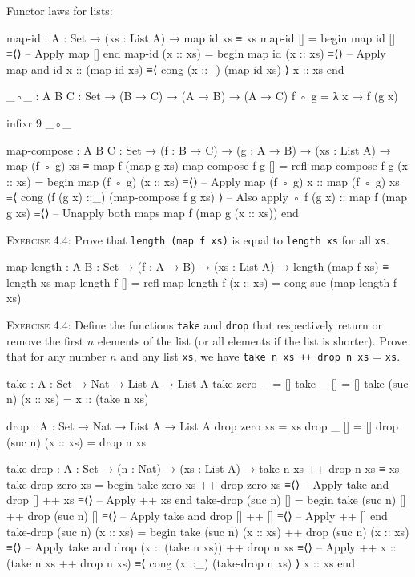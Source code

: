 \documentclass{article}
\begin{document}
\noindent
Functor laws for lists:

\begin{code}
map-id : { A : Set } → (xs : List A) → map id xs ≡ xs
map-id [] =
  begin
    map id []
  ≡⟨⟩ -- Apply map
    []
  end
map-id (x :: xs) =
  begin
    map id (x :: xs)
  ≡⟨⟩ -- Apply map and id
    x :: (map id xs)
  ≡⟨ cong (x ::_) (map-id xs) ⟩
    x :: xs
  end
\end{code}

\begin{code}
_◦_ : {A B C : Set} → (B → C) → (A → B) → (A → C)
f ◦ g = λ x → f (g x)

infixr 9 _◦_

map-compose : {A B C : Set} → (f : B → C) → (g : A → B)
    → (xs : List A) → map (f ◦ g) xs ≡ map f (map g xs)
map-compose f g [] = refl
map-compose f g (x :: xs) =
  begin
    map (f ◦ g) (x :: xs)
  ≡⟨⟩ -- Apply map
    (f ◦ g) x :: map (f ◦ g) xs
  ≡⟨ cong (f (g x) ::_) (map-compose f g xs) ⟩ -- Also apply ◦
    f (g x) :: map f (map g xs)
  ≡⟨⟩ -- Unapply both maps
    map f (map g (x :: xs))
  end
\end{code}

\noindent
\textsc{Exercise 4.4}: Prove that \verb!length (map f xs)! is equal to \verb!length xs! for all \verb!xs!.

\begin{code}
map-length : {A B : Set} → (f : A → B) → (xs : List A)
    → length (map f xs) ≡ length xs
map-length f [] = refl
map-length f (x :: xs) = cong suc (map-length f xs)
\end{code}

\noindent
\textsc{Exercise 4.4}: Define the functions \texttt{take} and \texttt{drop} that respectively return or remove the first $n$ elements of the list (or all elements if the list is shorter). Prove that for any number $n$ and any list \verb!xs!, we have \verb!take n xs ++ drop n xs! = \verb!xs!.

\begin{code}
take : {A : Set} → Nat → List A → List A
take zero _ = []
take _ [] = []
take (suc n) (x :: xs) = x :: (take n xs)

drop : {A : Set} → Nat → List A → List A
drop zero xs = xs
drop _ [] = []
drop (suc n) (x :: xs) = drop n xs
\end{code}

\begin{code}
take-drop : {A : Set} → (n : Nat) → (xs : List A)
    → take n xs ++ drop n xs ≡ xs
take-drop zero xs =
  begin
    take zero xs ++ drop zero xs
  ≡⟨⟩ -- Apply take and drop
    [] ++ xs
  ≡⟨⟩ -- Apply ++
    xs
  end
take-drop (suc n) [] =
  begin
    take (suc n) [] ++ drop (suc n) []
  ≡⟨⟩ -- Apply take and drop
    [] ++ []
  ≡⟨⟩ -- Apply ++
    []
  end
take-drop (suc n) (x :: xs) =
  begin
    take (suc n) (x :: xs) ++ drop (suc n) (x :: xs)
  ≡⟨⟩ -- Apply take and drop
    (x :: (take n xs)) ++ drop n xs
  ≡⟨⟩ -- Apply ++
    x :: (take n xs ++ drop n xs)
  ≡⟨ cong (x ::_) (take-drop n xs) ⟩
    x :: xs
  end
\end{code}
\end{document}
